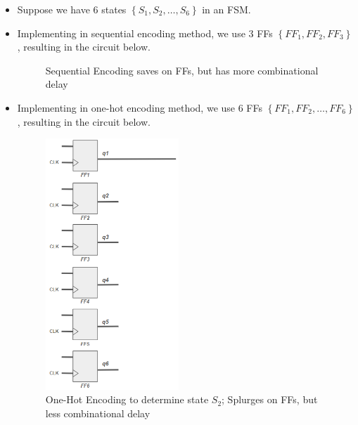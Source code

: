 \documentclass{article}
\begin{document}
\begin{itemize}
    \item Suppose we have 6 states $\left\{S_{1},S_{2},\dots,S_{6}\right\}$ in an FSM.
    \item Implementing in sequential encoding method, we use 3 FFs $\left\{FF_{1},FF_{2},FF_{3}\right\}$, resulting in the circuit below.
        \begin{figure}[htp]%
            \centering
            \qquad
            \caption{Sequential Encoding saves on FFs, but has more combinational delay}%
        \end{figure}
    \item Implementing in one-hot encoding method, we use 6 FFs $\left\{FF_{1},FF_{2}, \dots, FF_{6}\right\}$, resulting in the circuit below.
        \begin{figure}[htp]
            \centering
            \includegraphics[width=5cm, scale=1]{S2/oneHotEncoding.PNG}
            \caption{One-Hot Encoding to determine state $S_{2}$; Splurges on FFs, but less combinational delay}
        \end{figure}
\end{itemize}
\end{document}
